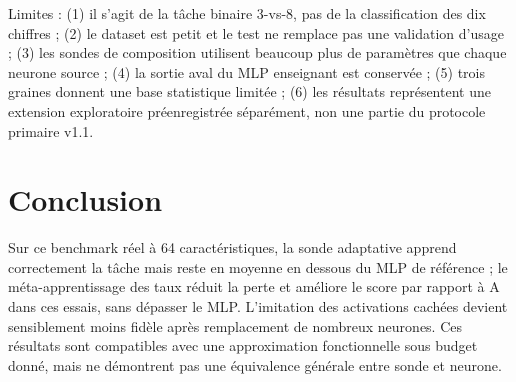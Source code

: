 \documentclass[11pt,a4paper]{article}
\begin{document}
Limites : (1) il s'agit de la tâche binaire 3-vs-8, pas de la classification des dix chiffres ; (2) le dataset est petit et le test ne remplace pas une validation d'usage ; (3) les sondes de composition utilisent beaucoup plus de paramètres que chaque neurone source ; (4) la sortie aval du MLP enseignant est conservée ; (5) trois graines donnent une base statistique limitée ; (6) les résultats représentent une extension exploratoire préenregistrée séparément, non une partie du protocole primaire v1.1.

\section{Conclusion}
Sur ce benchmark réel à 64 caractéristiques, la sonde adaptative apprend correctement la tâche mais reste en moyenne en dessous du MLP de référence ; le méta-apprentissage des taux réduit la perte et améliore le score par rapport à A dans ces essais, sans dépasser le MLP. L'imitation des activations cachées devient sensiblement moins fidèle après remplacement de nombreux neurones. Ces résultats sont compatibles avec une approximation fonctionnelle sous budget donné, mais ne démontrent pas une équivalence générale entre sonde et neurone.
\end{document}
